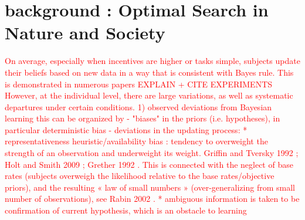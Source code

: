 \section{background : Optimal Search in Nature and Society}


\textcolor{red}{
On average, especially when incentives are higher or tasks simple, subjects update their beliefs based on new data in a way that is consistent with Bayes rule.  This is demonstrated in numerous papers \cite{Griffiths2008}EXPLAIN + CITE EXPERIMENTS
However, at the individual level, there are large variations, as well as systematic departures under certain conditions. 
1) observed deviations from Bayesian learning
this can be organized by 
- "biases" in the priors (i.e. hypotheses), in particular deterministic bias
- deviations in the updating process: 
* representativeness heuristic/availability bias : tendency to overweight the strength of an observation and underweight its weight. Griffin and Tversky 1992 \cite{griffin1992weighing}; Holt and Smith 2009 \cite{holt2009update} ; Grether 1992 \cite{grether1992testing}. This is connected with the neglect of base rates (subjects overweigh the likelihood relative to the base rates/objective priors), and the resulting « law of small numbers » (over-generalizing from small number of observations), see Rabin 2002 \cite{rabin2002perspective}.
* ambiguous information is taken to be confirmation of current hypothesis, which is an obstacle to learning
}
